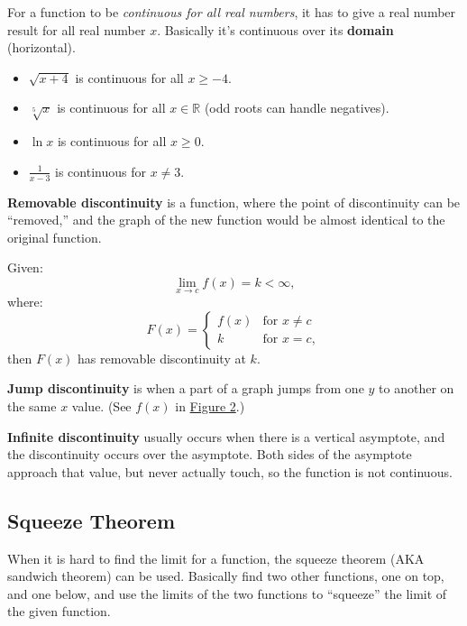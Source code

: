 \documentclass[12pt]{article}
\begin{document}
            For a function to be \textit{continuous for all real numbers}, it has to give a real number result for all real number $x$. Basically it's continuous over its \textbf{domain} (horizontal).

            \begin{itemize}
                \item $\sqrt{x+4}$ is continuous for all $x \ge -4$.
                \item $\sqrt[5]{x}$ is continuous for all $x \in \mathbb{R}$ (odd roots can handle negatives).
                \item $\ln{x}$ is continuous for all $x \ge 0$.
                \item $\frac{1}{x-3}$ is continuous for $x \ne 3$.
            \end{itemize}

            \textbf{Removable discontinuity} is a function, where the point of discontinuity can be ``removed,'' and the graph of the new function would be almost identical to the original function.

            \noindent Given:
            \[ \lim_{x \to c} f(x) = k < \infty, \]
            where:
            \[ F(x) = \begin{cases}
                f(x) &\text{for } x \ne c \\
                k &\text{for } x = c,
            \end{cases} \]
            then $F(x)$ has removable discontinuity at $k$.

            \textbf{Jump discontinuity} is when a part of a graph jumps from one $y$ to another on the same $x$ value. (See $f(x)$ in \hyperref[fig:limproperties]{Figure 2}.)

            \textbf{Infinite discontinuity} usually occurs when there is a vertical asymptote, and the discontinuity occurs over the asymptote. Both sides of the asymptote approach that value, but never actually touch, so the function is not continuous.

        \subsection{Squeeze Theorem}
            When it is hard to find the limit for a function, the squeeze theorem (AKA sandwich theorem) can be used. Basically find two other functions, one on top, and one below, and use the limits of the two functions to ``squeeze'' the limit of the given function.
\end{document}
